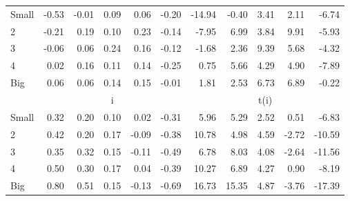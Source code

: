 \begin{table}[!ht]
\begin{tabular}{lrrrrrrrrrr}
    \\
      \cmidrule(r){2-6} \cmidrule(r){7-11}

    Small   & -0.53  & -0.01  & 0.09  & 0.06  & -0.20  & -14.94  & -0.40  & 3.41  & 2.11  & -6.74  \\
         2  & -0.21  & 0.19  & 0.10  & 0.23  & -0.14  & -7.95  & 6.99  & 3.84  & 9.91  & -5.93  \\
         3  & -0.06  & 0.06  & 0.24  & 0.16  & -0.12  & -1.68  & 2.36  & 9.39  & 5.68  & -4.32  \\
         4  & 0.02  & 0.16  & 0.11  & 0.14  & -0.25  & 0.75  & 5.66  & 4.29  & 4.90  & -7.89  \\
    Big     & 0.06  & 0.06  & 0.14  & 0.15  & -0.01  & 1.81  & 2.53  & 6.73  & 6.89  & -0.22  \\

  
    
      & \multicolumn{5}{c}{i} & \multicolumn{5}{c}{t(i)}
    
    \\
      \cmidrule(r){2-6} \cmidrule(r){7-11}

    Small   & 0.32  & 0.20  & 0.10  & 0.02  & -0.31  & 5.96  & 5.29  & 2.52  & 0.51  & -6.83  \\
         2  & 0.42  & 0.20  & 0.17  & -0.09  & -0.38  & 10.78  & 4.98  & 4.59  & -2.72  & -10.59  \\
         3  & 0.35  & 0.32  & 0.15  & -0.11  & -0.49  & 6.78  & 8.03  & 4.08  & -2.64  & -11.56  \\
         4  & 0.50  & 0.30  & 0.17  & 0.04  & -0.39  & 10.27  & 6.89  & 4.27  & 0.90  & -8.19  \\
    Big     & 0.80  & 0.51  & 0.15  & -0.13  & -0.69  & 16.73  & 15.35  & 4.87  & -3.76  & -17.39  \\

  

  \bottomrule
\end{tabular}
\label{tbl:25_Size_Inv_F15}
\end{table}